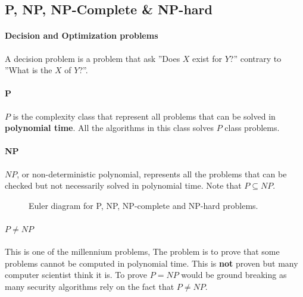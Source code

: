\documentclass[12pt]{article} %
\begin{document}
\subsection{P, NP, NP-Complete \& NP-hard}

\paragraph{Decision and Optimization problems}
A decision problem is a problem that ask ''Does $X$ exist for $Y$?'' contrary to ''What is the $X$ of $Y$?''.

\paragraph{P}
$P$ is the complexity class that represent all problems that can be solved in \textbf{polynomial time}. All the algorithms in this class solves $P$ class problems.

\paragraph{NP}
$NP$, or non-deterministic polynomial, represents all the problems that can be checked but not necessarily solved in polynomial time. Note that $P \subseteq NP$.

\begin{figure}[H]
\caption{Euler diagram for P, NP, NP-complete and NP-hard problems.}
\label{npProblems}
\end{figure} 

\paragraph{$P \neq NP$}
This is one of the millennium problems, The problem is to prove that some problems cannot be computed in polynomial time. This is \textbf{not} proven but many computer scientist think it is. To prove $P = NP$ would be ground breaking as many security algorithms rely on the fact that $P \neq NP$.
\end{document}
